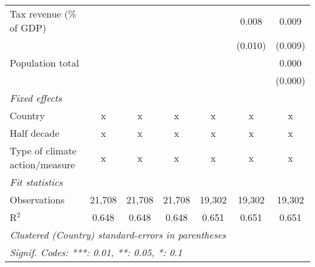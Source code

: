 \begin{tabular}{lcccccc}
   Tax revenue (\% of GDP)                                 &               &               &               &               & 0.008         & 0.009\\   
                                                           &               &               &               &               & (0.010)       & (0.009)\\   
   Population total                                        &               &               &               &               &               & 0.000\\   
                                                           &               &               &               &               &               & (0.000)\\   
   \emph{Fixed effects}\\
   Country                                                 & x             & x             & x             & x             & x             & x\\  
   Half decade                                             & x             & x             & x             & x             & x             & x\\  
   Type of climate action/measure                          & x             & x             & x             & x             & x             & x\\  
   \midrule \emph{Fit statistics}\\
   Observations                                            & 21,708        & 21,708        & 21,708        & 19,302        & 19,302        & 19,302\\  
   R$^2$                                                   & 0.648         & 0.648         & 0.648         & 0.651         & 0.651         & 0.651\\  
   \midrule
   \multicolumn{7}{l}{\emph{Clustered (Country) standard-errors in parentheses}}\\
   \multicolumn{7}{l}{\emph{Signif. Codes: ***: 0.01, **: 0.05, *: 0.1}}\\
\end{tabular}
\par\endgroup


